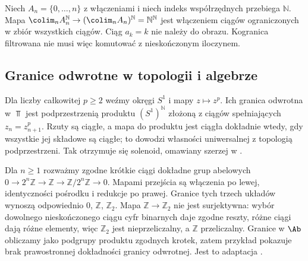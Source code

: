 \begin{przyklad}\label{cat:ex:filtered-infinite}
Niech $A_n=\{0,\ldots,n\}$ z włączeniami i niech indeks współrzędnych przebiega $\mathbb N$. Mapa
$\colim_n A_n^{\mathbb N}\to(\colim_n A_n)^{\mathbb N}=\mathbb N^{\mathbb N}$
jest włączeniem ciągów ograniczonych w zbiór wszystkich ciągów. Ciąg $a_k=k$ nie należy do obrazu. Kogranica filtrowana nie musi więc komutować z nieskończonym iloczynem.
\end{przyklad}

\subsection{Granice odwrotne w topologii i algebrze}

\begin{przyklad}[Solenoid]
Dla liczby całkowitej $p\ge2$ weźmy okręgi $S^1$ i mapy $z\mapsto z^p$. Ich granica odwrotna w $\Top$ jest podprzestrzenią produktu $(S^1)^{\mathbb N}$ złożoną z ciągów spełniających $z_n=z_{n+1}^p$. Rzuty są ciągłe, a mapa do produktu jest ciągła dokładnie wtedy, gdy wszystkie jej składowe są ciągłe; to dowodzi własności uniwersalnej z topologią podprzestrzeni. Tak otrzymuje się solenoid, omawiany szerzej w .
\end{przyklad}

\begin{przyklad}\label{cat:ex:inverse-not-exact}
Dla $n\ge1$ rozważmy zgodne krótkie ciągi dokładne grup abelowych
$0\to2^n\mathbb Z\to\mathbb Z\to\mathbb Z/2^n\mathbb Z\to0$.
Mapami przejścia są włączenia po lewej, identyczności pośrodku i redukcje po prawej. Granice tych trzech układów wynoszą odpowiednio $0$, $\mathbb Z$, $\mathbb Z_2$. Mapa $\mathbb Z\to\mathbb Z_2$ nie jest surjektywna: wybór dowolnego nieskończonego ciągu cyfr binarnych daje zgodne reszty, różne ciągi dają różne elementy, więc $\mathbb Z_2$ jest nieprzeliczalny, a $\mathbb Z$ przeliczalny. Granice w $\Ab$ obliczamy jako podgrupy produktu zgodnych krotek, zatem przykład pokazuje brak prawostronnej dokładności granicy odwrotnej. Jest to adaptacja .
\end{przyklad}

